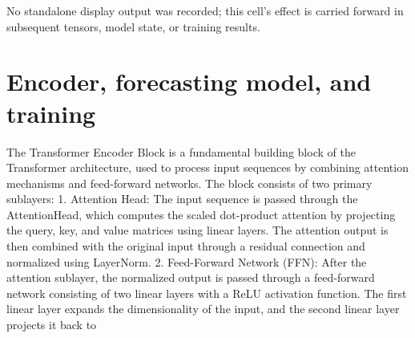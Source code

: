 \documentclass[../labs.tex]{subfiles}
\begin{document}
\hypertarget{res:lab02-text-02-attention-ipynb-18-5d282457266c}{}\noindent No standalone display output was recorded; this cell’s effect is carried forward in subsequent tensors, model state, or training results.

\section{Encoder, forecasting model, and training}



\noindent The Transformer Encoder Block is a fundamental building block of the Transformer architecture, used to process input sequences by combining attention mechanisms and feed-forward networks. The block consists of two primary sublayers: 1. Attention Head: The input sequence is passed through the AttentionHead, which computes the scaled dot-product attention by projecting the query, key, and value matrices using linear layers. The attention output is then combined with the original input through a residual connection and normalized using LayerNorm. 2. Feed-Forward Network (FFN): After the attention sublayer, the normalized output is passed through a feed-forward network consisting of two linear layers with a ReLU activation function. The first linear layer expands the dimensionality of the input, and the second linear layer projects it back to
\end{document}
